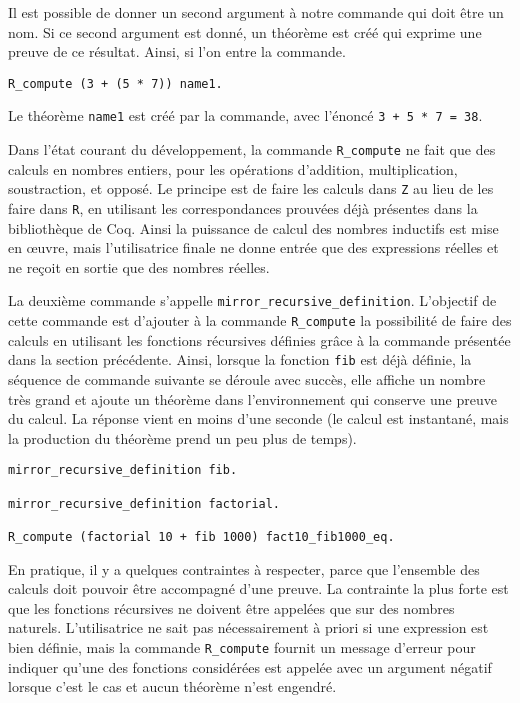 \documentclass[draft]{jflart}
\begin{document}
Il est possible de donner un second argument à notre commande qui doit
être un nom.  Si ce second argument est donné, un théorème est créé
qui exprime une preuve de ce résultat.  Ainsi, si l'on entre la
commande.
\begin{verbatim}
R_compute (3 + (5 * 7)) name1.
\end{verbatim}
Le théorème \texttt{name1} est créé par la commande, avec l'énoncé \texttt{3
  + 5 * 7 = 38}.

Dans l'état courant du développement, la commande \texttt{R\_compute}
ne fait que des calculs en nombres entiers, pour les opérations
d'addition, multiplication, soustraction, et opposé.  Le principe est
de faire les calculs dans \texttt{Z} au lieu de les faire dans \texttt{R},
en utilisant les correspondances prouvées déjà présentes dans la
bibliothèque de Coq.  Ainsi la puissance de calcul des nombres
inductifs est mise en œuvre, mais l'utilisatrice finale ne donne
entrée que des expressions réelles et ne reçoit en sortie que des
nombres réelles.

La deuxième commande s'appelle \texttt{mirror\_recursive\_definition}.
L'objectif de cette commande est d'ajouter à la commande
\texttt{R\_compute} la possibilité de faire des calculs en utilisant
les fonctions récursives définies grâce à la commande présentée dans
la section précédente.  Ainsi, lorsque la fonction \texttt{fib} est
déjà définie, la séquence de commande suivante se déroule avec succès,
elle affiche un nombre très grand et ajoute un théorème dans
l'environnement qui conserve une preuve du calcul.  La réponse vient
en moins d'une seconde (le calcul est instantané, mais la production
du théorème prend un peu plus de temps).
\begin{verbatim}
mirror_recursive_definition fib.

mirror_recursive_definition factorial.

R_compute (factorial 10 + fib 1000) fact10_fib1000_eq.
\end{verbatim}
En pratique, il y a quelques contraintes à respecter, parce que
l'ensemble des calculs doit pouvoir être accompagné d'une preuve.  La
contrainte la plus forte est que les fonctions récursives ne doivent
être appelées que sur des nombres naturels.  L'utilisatrice ne sait
pas nécessairement à priori si une expression est bien définie, mais
la commande \texttt{R\_compute} fournit un message d'erreur pour indiquer
qu'une des fonctions considérées est appelée avec un argument négatif
lorsque c'est le cas et aucun théorème n'est engendré.
\end{document}
